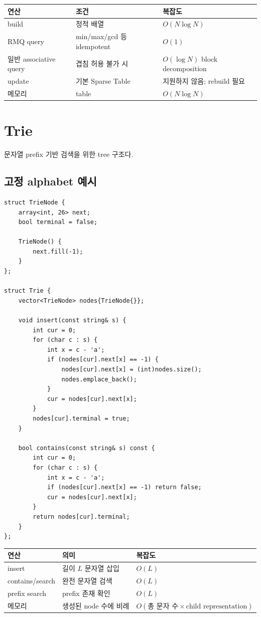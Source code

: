 \begin{center}
\begin{tabularx}{\textwidth}{p{4cm}p{5cm}X}
\toprule
연산 & 조건 & 복잡도 \\
\midrule
build & 정적 배열 & $O(N\log N)$ \\
RMQ query & min/max/gcd 등 idempotent & $O(1)$ \\
일반 associative query & 겹침 허용 불가 시 & $O(\log N)$ block decomposition \\
update & 기본 Sparse Table & 지원하지 않음; rebuild 필요 \\
메모리 & table & $O(N\log N)$ \\
\bottomrule
\end{tabularx}
\end{center}

\section{Trie}
문자열 prefix 기반 검색을 위한 tree 구조다.

\subsection{고정 alphabet 예시}
\begin{lstlisting}
struct TrieNode {
    array<int, 26> next;
    bool terminal = false;

    TrieNode() {
        next.fill(-1);
    }
};

struct Trie {
    vector<TrieNode> nodes{TrieNode{}};

    void insert(const string& s) {
        int cur = 0;
        for (char c : s) {
            int x = c - 'a';
            if (nodes[cur].next[x] == -1) {
                nodes[cur].next[x] = (int)nodes.size();
                nodes.emplace_back();
            }
            cur = nodes[cur].next[x];
        }
        nodes[cur].terminal = true;
    }

    bool contains(const string& s) const {
        int cur = 0;
        for (char c : s) {
            int x = c - 'a';
            if (nodes[cur].next[x] == -1) return false;
            cur = nodes[cur].next[x];
        }
        return nodes[cur].terminal;
    }
};
\end{lstlisting}

\begin{center}
\begin{tabularx}{\textwidth}{p{4cm}p{5cm}X}
\toprule
연산 & 의미 & 복잡도 \\
\midrule
insert & 길이 $L$ 문자열 삽입 & $O(L)$ \\
contains/search & 완전 문자열 검색 & $O(L)$ \\
prefix search & prefix 존재 확인 & $O(L)$ \\
메모리 & 생성된 node 수에 비례 & $O(\text{총 문자 수}\times\text{child representation})$ \\
\bottomrule
\end{tabularx}
\end{center}

